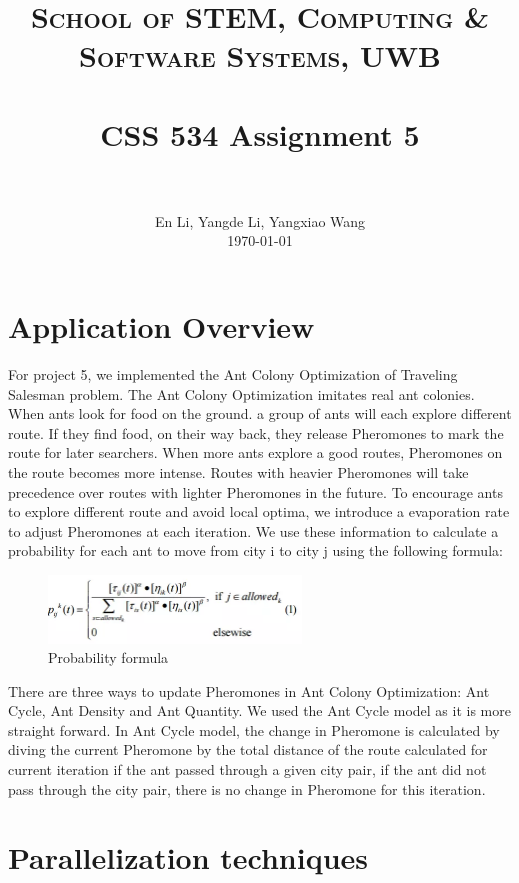 \documentclass[11pt, letterpaper]{article}
\title{
	\usefont{OT1}{bch}{b}{n}
	\normalfont \normalsize \textsc{School of STEM, Computing \& Software Systems, UWB } \\ [25pt]
	\horrule{0.5pt} \\[0.4cm]
	\huge CSS 534 Assignment 5 \\
	\horrule{2pt} \\[0.5cm]
}
\author{
	\normalfont 								\normalsize
	En Li, Yangde Li, Yangxiao Wang\\[-3pt]		\normalsize
	\today
}
\date{}
\begin{document}
	
	\maketitle
	\pagebreak
	\tableofcontents
	\pagebreak
	
	\section{Application Overview}
	For project 5, we implemented the Ant Colony Optimization of Traveling Salesman problem. The Ant Colony Optimization imitates real ant colonies. When ants look for food on the ground. a group of ants will each explore different route. If they find food, on their way back, they release Pheromones to mark the route for later searchers. When more ants explore a good routes, Pheromones on the route becomes more intense. Routes with heavier Pheromones will take precedence over routes with lighter Pheromones in the future. To encourage ants to explore different route and avoid local optima, we introduce a evaporation rate to adjust Pheromones at each iteration. We use these information to calculate a probability for each ant to move from city i to city j using the following formula: \par
	\begin{figure}[!htb]
		\centering
		\includegraphics[width=0.6\textwidth]{sum}
		\caption{Probability formula}
	\end{figure}
	There are three ways to update Pheromones in Ant Colony Optimization:  Ant Cycle, Ant Density and Ant Quantity. We used the Ant Cycle model as it is more straight forward. In Ant Cycle model, the change in Pheromone is calculated by diving the current Pheromone by the total distance of the route calculated for current iteration if the ant passed through a given city pair, if the ant did not pass through the city pair, there is no change in Pheromone for this iteration.
	
	
	\section {Parallelization techniques}
	
\end{document}
